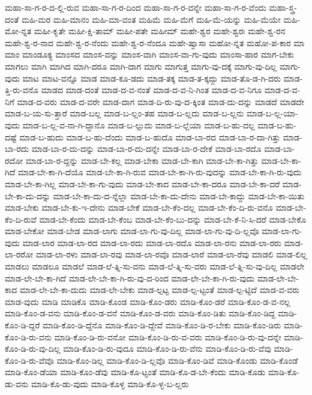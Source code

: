 {ಮಹಾ-ಸಾ-ಗ-ರ-ದ-ಲ್ಲಿ-ರುವ
ಮಹಾ-ಸಾ-ಗ-ರ-ದಿಂದ
ಮಹಾ-ಸಾ-ಗ-ರ-ವನ್ನೇ
ಮಹಾ-ಸಾ-ಗ-ರ-ವೆಂದು
ಮಹಾ-ಸ್ತ್ರ-ದಂತೆ
ಮಹಿ-ಮರ
ಮಹಿ-ಮಾನಂ
ಮಹಿ-ಮಾ-ವಂತ
ಮಹಿಮೆ
ಮಹಿ-ಮೆಗೆ
ಮಹಿ-ಮೆ-ಯನ್ನು
ಮಹಿ-ಮೆಯೇ
ಮಹಿ-ಮೋ-ನ್ನತ
ಮಹೀ-ಕೃತೇ
ಮಹೀ-ಕ್ಷಿ-ತಾಮ್
ಮಹೀ-ಪತೇ
ಮಹೀಮ್
ಮಹೇ-ಶ್ವರ
ಮಹೇ-ಶ್ವರಃ
ಮಹೇ-ಶ್ವ-ರನ
ಮಹೇ-ಶ್ವ-ರ-ನಾದ
ಮಹೇ-ಶ್ವ-ರ-ನೆಂದು
ಮಹೇ-ಶ್ವ-ರ-ನೆಂದೂ
ಮಹೇ-ಷ್ವಾಸಾ
ಮಹೋ-ನ್ನತ
ಮಹೋ-ಪ-ಕಾರ
ಮಾ
ಮಾಂ
ಮಾಂಡೂಕ್ಯ
ಮಾಂಸದ
ಮಾಂಸ-ವನ್ನು
ಮಾಂಸ-ವಾಗಿ
ಮಾಂಸ-ವಾ-ಗು-ವುದು
ಮಾಂಸಾ-ಹಾರ
ಮಾಗ-ಬೇಕು
ಮಾಗಲು
ಮಾಗಿ
ಮಾಗಿದ
ಮಾಗಿ-ದರೂ
ಮಾಗಿ-ದಾಗ
ಮಾಗು
ಮಾಗುತ್ತ
ಮಾಗು-ವು-ದಕ್ಕೆ
ಮಾಗು-ವು-ದಿಲ್ಲ
ಮಾಗು-ವುದು
ಮಾಟ
ಮಾಟ-ವನ್ನೊ
ಮಾಡ
ಮಾಡ-ಕೂ-ಡದು
ಮಾಡ-ತಕ್ಕ
ಮಾಡ-ತ-ಕ್ಕದ್ದು
ಮಾಡ-ತೊ-ಡ-ಗಿ-ದರು
ಮಾಡ-ತ್ತಿ-ರು-ವನೊ
ಮಾಡದ
ಮಾಡ-ದಂತೆ
ಮಾಡ-ದ-ವ-ನಂತೆ
ಮಾಡ-ದ-ವ-ನಿ-ಗಿಂತ
ಮಾಡ-ದ-ವ-ನಿಗೂ
ಮಾಡ-ದ-ವ-ನಿಗೆ
ಮಾಡ-ದ-ವರು
ಮಾಡ-ದ-ವರೇ
ಮಾಡ-ದಾಗ
ಮಾಡ-ದಿ-ರು-ವು-ದ-ಕ್ಕಿಂತ
ಮಾಡ-ದು-ದನ್ನು
ಮಾಡದೆ
ಮಾಡದೇ
ಮಾಡ-ಬ-ಯ-ಸು-ತ್ತಾರೆ
ಮಾಡ-ಬಲ್ಲ
ಮಾಡ-ಬ-ಲ್ಲಂ-ತಹ
ಮಾಡ-ಬ-ಲ್ಲದು
ಮಾಡ-ಬ-ಲ್ಲನು
ಮಾಡ-ಬ-ಲ್ಲ-ಯಾ-ವುದು
ಮಾಡ-ಬ-ಲ್ಲ-ವ-ನಾ-ಗಿ-ದ್ದಾನೊ
ಮಾಡ-ಬ-ಲ್ಲುದು
ಮಾಡ-ಬ-ಲ್ಲೆಯಾ
ಮಾಡ-ಬ-ಹು-ದಲ್ಲ
ಮಾಡ-ಬ-ಹು-ದಷ್ಟೆ
ಮಾಡ-ಬ-ಹುದು
ಮಾಡ-ಬ-ಹು-ದೆಂದು
ಮಾಡ-ಬ-ಹುದೊ
ಮಾಡ-ಬಾ-ರದ
ಮಾಡ-ಬಾ-ರ-ದಾ-ಗಿತ್ತು
ಮಾಡ-ಬಾ-ರದು
ಮಾಡ-ಬಾ-ರ-ದು-ದನ್ನು
ಮಾಡ-ಬಾ-ರ-ದು-ದನ್ನೇ
ಮಾಡ-ಬಾ-ರ-ದೇಕೆ
ಮಾಡ-ಬಾ-ರದೊ
ಮಾಡ-ಬಾ-ರದೋ
ಮಾಡ-ಬಾ-ರ-ದ್ದನ್ನು
ಮಾಡ-ಬೇ-ಕಲ್ಲ
ಮಾಡ-ಬೇಕಾ
ಮಾಡ-ಬೇ-ಕಾಗಿ
ಮಾಡ-ಬೇ-ಕಾ-ಗಿತ್ತು
ಮಾಡ-ಬೇ-ಕಾ-ಗಿದೆ
ಮಾಡ-ಬೇ-ಕಾ-ಗಿ-ದೆಯೊ
ಮಾಡ-ಬೇ-ಕಾ-ಗಿ-ರುವ
ಮಾಡ-ಬೇ-ಕಾ-ಗಿ-ರು-ವುದನ್ನು
ಮಾಡ-ಬೇ-ಕಾ-ಗಿ-ರು-ವುದು
ಮಾಡ-ಬೇ-ಕಾ-ಗಿಲ್ಲ
ಮಾಡ-ಬೇ-ಕಾ-ಗು-ವುದು
ಮಾಡ-ಬೇ-ಕಾದ
ಮಾಡ-ಬೇ-ಕಾ-ದರೂ
ಮಾಡ-ಬೇ-ಕಾ-ದರೆ
ಮಾಡ-ಬೇ-ಕಾ-ದು-ದನ್ನು
ಮಾಡ-ಬೇ-ಕಾ-ದು-ದ-ನ್ನೆಲ್ಲಾ
ಮಾಡ-ಬೇ-ಕಾ-ದು-ದೇನು
ಮಾಡ-ಬೇ-ಕಾದ್ದು
ಮಾಡ-ಬೇ-ಕಾ-ಯಿತು
ಮಾಡ-ಬೇಕು
ಮಾಡ-ಬೇ-ಕು-ಇ-ದೇನು
ಮಾಡ-ಬೇಕೆ
ಮಾಡ-ಬೇ-ಕೆಂ-ದಲ್ಲ
ಮಾಡ-ಬೇ-ಕೆಂ-ದಿ-ರು-ವನೊ
ಮಾಡ-ಬೇ-ಕೆಂ-ದಿ-ರುವೆ
ಮಾಡ-ಬೇ-ಕೆಂದು
ಮಾಡ-ಬೇ-ಕೆಂಬ
ಮಾಡ-ಬೇ-ಕೆಂ-ಬು-ದನ್ನು
ಮಾಡ-ಬೇ-ಕೆ-ನಿ-ಸಿ-ದರೆ
ಮಾಡ-ಬೇಕೊ
ಮಾಡ-ಬೇಕೋ
ಮಾಡ-ಬೇಡ
ಮಾಡ-ಲಾಗು
ಮಾಡ-ಲಾ-ಗು-ವು-ದಿಲ್ಲ
ಮಾಡ-ಲಾ-ಗು-ವು-ದಿ-ಲ್ಲವೊ
ಮಾಡ-ಲಾ-ಗು-ವುದು
ಮಾಡ-ಲಾರ
ಮಾಡ-ಲಾ-ರದ
ಮಾಡ-ಲಾ-ರದು
ಮಾಡ-ಲಾ-ರದೊ
ಮಾಡ-ಲಾ-ರನು
ಮಾಡ-ಲಾ-ರರು
ಮಾಡ-ಲಾ-ರರೋ
ಮಾಡ-ಲಾ-ರಳು
ಮಾಡ-ಲಾ-ರವು
ಮಾಡ-ಲಾ-ರವೊ
ಮಾಡ-ಲಾರೆ
ಮಾಡ-ಲಾ-ರೆವು
ಮಾಡಲಿ
ಮಾಡ-ಲಿಲ್ಲ
ಮಾಡಲು
ಮಾಡಲೂ
ಮಾಡಲೆ
ಮಾಡ-ಲೆ-ತ್ನಿ-ಸು-ವನು
ಮಾಡ-ಲೆ-ತ್ನಿ-ಸು-ವರು
ಮಾಡ-ಲೆ-ತ್ನಿ-ಸು-ವು-ದಿಲ್ಲ
ಮಾಡಲೇ
ಮಾಡ-ಲೇ-ಬೇ-ಕಾ-ಗಿದೆ
ಮಾಡ-ಲೇ-ಬೇ-ಕಾ-ಗಿ-ರು-ವು-ದ-ರಿಂದ
ಮಾಡ-ಲೇ-ಬೇ-ಕಾ-ಗಿ-ರು-ವುದು
ಮಾಡ-ಲೇ-ಬೇ-ಕಾದ
ಮಾಡ-ಲೇ-ಬೇ-ಕಾ-ದುದು
ಮಾಡ-ಲೇ-ಬೇಕು
ಮಾಡ-ಲ್ಪಟ್ಟ
ಮಾಡ-ಲ್ಪ-ಟ್ಟಂತೆ
ಮಾಡ-ಲ್ಪ-ಟ್ಟಿದೆ
ಮಾಡ-ವ-ವರು
ಮಾಡ-ವುದು
ಮಾಡಿ
ಮಾಡಿಕೊ
ಮಾಡಿ-ಕೊಂಡ
ಮಾಡಿ-ಕೊಂ-ಡರು
ಮಾಡಿ-ಕೊಂ-ಡರೆ
ಮಾಡಿ-ಕೊಂ-ಡ-ವ-ನಲ್ಲ
ಮಾಡಿ-ಕೊಂ-ಡ-ವನು
ಮಾಡಿ-ಕೊಂ-ಡ-ವನೆ
ಮಾಡಿ-ಕೊಂ-ಡ-ವರು
ಮಾಡಿ-ಕೊಂ-ಡಿತು
ಮಾಡಿ-ಕೊಂ-ಡಿದ್ದ
ಮಾಡಿ-ಕೊಂ-ಡಿ-ದ್ದರೆ
ಮಾಡಿ-ಕೊಂ-ಡಿ-ದ್ದೆನೊ
ಮಾಡಿ-ಕೊಂ-ಡಿ-ದ್ದೇವೆ
ಮಾಡಿ-ಕೊಂ-ಡಿ-ರ-ಬೇಕು
ಮಾಡಿ-ಕೊಂ-ಡಿರು
ಮಾಡಿ-ಕೊಂ-ಡಿ-ರು-ವನು
ಮಾಡಿ-ಕೊಂ-ಡಿ-ರು-ವನೋ
ಮಾಡಿ-ಕೊಂ-ಡಿ-ರು-ವ-ವರು
ಮಾಡಿ-ಕೊಂ-ಡಿ-ರು-ವು-ದನ್ನೇ
ಮಾಡಿ-ಕೊಂ-ಡಿ-ರು-ವು-ದಿಲ್ಲ
ಮಾಡಿ-ಕೊಂ-ಡಿ-ರು-ವುದೂ
ಮಾಡಿ-ಕೊಂ-ಡಿ-ರು-ವೆನು
ಮಾಡಿ-ಕೊಂ-ಡಿ-ರು-ವೆವು
ಮಾಡಿ-ಕೊಂ-ಡಿ-ರು-ವೆವೊ
ಮಾಡಿ-ಕೊಂ-ಡಿಲ್ಲ
ಮಾಡಿ-ಕೊಂ-ಡಿ-ಲ್ಲವೊ
ಮಾಡಿ-ಕೊಂ-ಡಿವೆ
ಮಾಡಿ-ಕೊಂಡು
ಮಾಡಿ-ಕೊಂಡೆ
ಮಾಡಿ-ಕೊಂ-ಡೆಯಾ
ಮಾಡಿ-ಕೊಂ-ಡೆವು
ಮಾಡಿ-ಕೊ-ಟ್ಟಂತೆ
ಮಾಡಿ-ಕೊ-ಡ-ಬೇ-ಕೆಂದು
ಮಾಡಿ-ಕೊಡು
ಮಾಡಿ-ಕೊ-ಡು-ವನು
ಮಾಡಿ-ಕೊ-ಡು-ವುದು
ಮಾಡಿ-ಕೊಳ್ಳ
ಮಾಡಿ-ಕೊ-ಳ್ಳ-ಬ-ಲ್ಲರು
}
